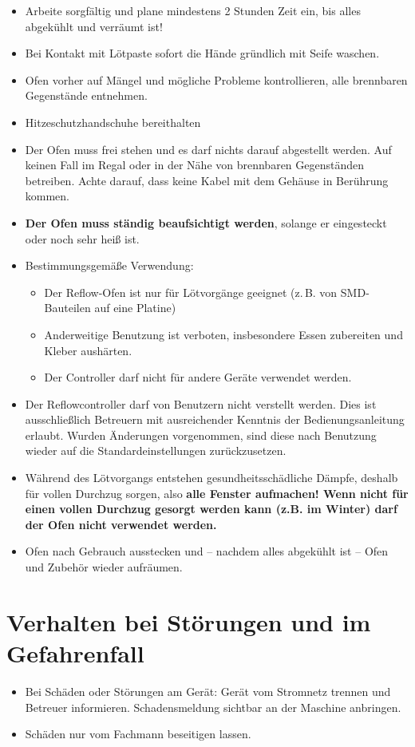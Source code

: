 \documentclass[fontsize=11pt]{scrartcl}
\begin{document}
\begin{itemize}
	\item Arbeite sorgfältig und plane mindestens 2 Stunden Zeit ein, bis alles abgekühlt und verräumt ist!
\item Bei Kontakt mit Lötpaste sofort die Hände gründlich mit Seife waschen.
	\item Ofen vorher auf Mängel und mögliche Probleme kontrollieren, alle brennbaren Gegenstände entnehmen.
	\item Hitzeschutzhandschuhe bereithalten
\item Der Ofen muss frei stehen und es darf nichts darauf abgestellt werden. Auf keinen Fall im Regal oder in der Nähe von brennbaren Gegenständen betreiben. Achte darauf, dass keine Kabel mit dem Gehäuse in Berührung kommen.
	\item \textbf{Der Ofen muss ständig beaufsichtigt werden}, solange er eingesteckt oder noch sehr heiß ist.
\item Bestimmungsgemäße Verwendung:
\begin{itemize}
\setlength{\itemsep}{-3pt}
\item Der Reflow-Ofen ist nur für Lötvorgänge geeignet (z.\,B. von SMD-Bauteilen auf eine Platine)
\item Anderweitige Benutzung ist verboten, insbesondere Essen zubereiten und Kleber aushärten.
\item Der Controller darf nicht für andere Geräte verwendet werden.
\end{itemize}
	\item Der Reflowcontroller darf von Benutzern nicht verstellt werden. Dies ist ausschließlich Betreuern mit ausreichender Kenntnis der Bedienungsanleitung erlaubt. Wurden Änderungen vorgenommen, sind diese nach Benutzung wieder auf die Standardeinstellungen zurückzusetzen.
	\item Während des Lötvorgangs entstehen gesundheitsschädliche Dämpfe, deshalb für vollen Durchzug sorgen, also \textbf{alle Fenster aufmachen! Wenn nicht für einen vollen Durchzug gesorgt werden kann (z.B. im Winter) darf der Ofen nicht verwendet werden.}
	\item Ofen nach Gebrauch ausstecken und -- nachdem alles abgekühlt ist -- Ofen und Zubehör wieder aufräumen.
\end{itemize}

\section{Verhalten bei Störungen und im Gefahrenfall}
\begin{itemize}
	\item Bei Schäden oder Störungen am Gerät: Gerät vom Stromnetz trennen und Betreuer informieren. Schadensmeldung sichtbar an der Maschine anbringen.
	\item Schäden nur vom Fachmann beseitigen lassen.
\end{itemize}
\end{document}
